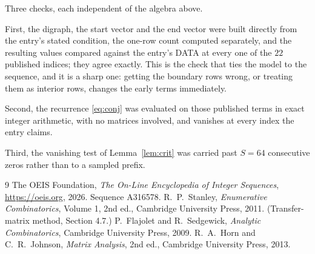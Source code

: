 \documentclass[11pt,a4paper]{article}
\theoremstyle{plain}
\theoremstyle{definition}
\begin{document}
Three checks, each independent of the algebra above.

First, the digraph, the start vector and the end vector were built directly from the
entry's stated condition, the one-row count computed separately, and the resulting values
compared against the entry's DATA at every one of the $22$ published indices; they
agree exactly. This is the check that ties the model to the sequence, and it is a sharp one:
getting the boundary rows wrong, or treating them as interior rows, changes the early terms
immediately.

Second, the recurrence \eqref{eq:conj} was evaluated on those published terms in exact
integer arithmetic, with no matrices involved, and vanishes at every index the entry claims.

Third, the vanishing test of Lemma~\ref{lem:crit} was carried past $S=64$ consecutive
zeros rather than to a sampled prefix.

\begin{thebibliography}{9}
 The OEIS Foundation, \emph{The On-Line Encyclopedia of Integer
Sequences}, \url{https://oeis.org}, 2026. Sequence A316578.
 R.~P.~Stanley, \emph{Enumerative Combinatorics}, Volume 1, 2nd ed.,
Cambridge University Press, 2011. (Transfer-matrix method, Section 4.7.)
 P.~Flajolet and R.~Sedgewick, \emph{Analytic Combinatorics}, Cambridge
University Press, 2009.
 R.~A.~Horn and C.~R.~Johnson, \emph{Matrix Analysis}, 2nd ed., Cambridge
University Press, 2013.
\end{thebibliography}
\end{document}

